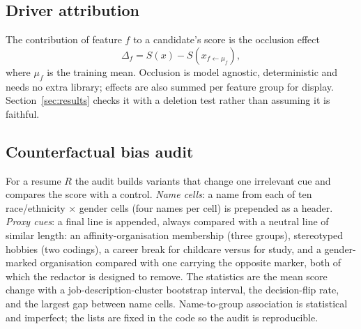 \subsection{Driver attribution}
The contribution of feature $f$ to a candidate's score is the occlusion effect
\begin{equation}
\Delta_f = S(x)-S(x_{f\leftarrow\mu_f}),
\end{equation}
where $\mu_f$ is the training mean. Occlusion is model agnostic, deterministic and needs no extra library;
effects are also summed per feature group for display. Section~\ref{sec:results} checks it with a
deletion test rather than assuming it is faithful.

\subsection{Counterfactual bias audit}\label{sec:audit}
For a resume $R$ the audit builds variants that change one irrelevant cue and compares the score with a
control. \emph{Name cells}: a name from each of ten race/ethnicity $\times$ gender cells (four names per
cell) is prepended as a header. \emph{Proxy cues}: a final line is appended, always compared with a neutral
line of similar length: an affinity-organisation membership (three groups), stereotyped hobbies (two
codings), a career break for childcare versus for study, and a gender-marked organisation compared with one
carrying the opposite marker, both of which the redactor is designed to remove. The statistics are the mean score change with a job-description-cluster
bootstrap interval, the decision-flip rate, and the largest gap between name cells. Name-to-group association
is statistical and imperfect; the lists are fixed in the code so the audit is reproducible.
